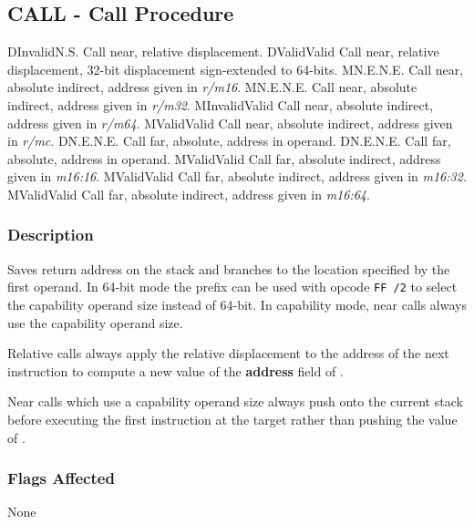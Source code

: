 \clearpage
{}
{}
\subsection*{CALL - Call Procedure}

\begin{x86opcodetable}
  {D}{Invalid}{N.S.}
  {Call near, relative displacement.}
  {D}{Valid}{Valid}
  {Call near, relative displacement, 32-bit displacement sign-extended
    to 64-bits.}
  {M}{N.E.}{N.E.}
  {Call near, absolute indirect, address given in \emph{r/m16}.}
  {M}{N.E.}{N.E.}
  {Call near, absolute indirect, address given in \emph{r/m32}.}
  {M}{Invalid}{Valid}
  {Call near, absolute indirect, address given in \emph{r/m64}.}
  {M}{Valid}{Valid}
  {Call near, absolute indirect, address given in \emph{r/mc}.}
  {D}{N.E.}{N.E.}
  {Call far, absolute, address in operand.}
  {D}{N.E.}{N.E.}
  {Call far, absolute, address in operand.}
  {M}{Valid}{Valid}
  {Call far, absolute indirect, address given in \emph{m16:16}.}
  {M}{Valid}{Valid}
  {Call far, absolute indirect, address given in \emph{m16:32}.}
  {M}{Valid}{Valid}
  {Call far, absolute indirect, address given in \emph{m16:64}.}
\end{x86opcodetable}

\begin{x86opentable}
\end{x86opentable}

\subsubsection*{Description}

Saves return address on the stack and branches to the location
specified by the first operand.  In 64-bit mode the 
prefix can be used with opcode \texttt{FF /2} to select the capability
operand size instead of 64-bit.  In capability mode, near calls always
use the capability operand size.

Relative calls always apply the relative displacement to the address
of the next instruction to compute a new value of the \textbf{address}
field of \CIP{}.

Near calls which use a capability operand size always push \CIP{} onto
the current stack before executing the first instruction at the target
rather than pushing the value of \RIP{}.

\subsubsection*{Flags Affected}

None
